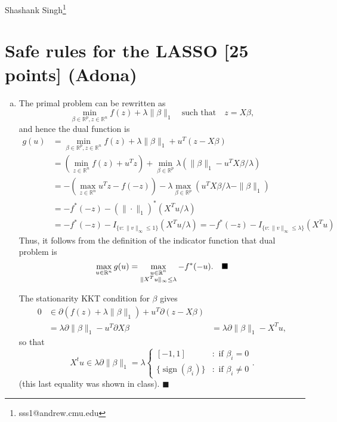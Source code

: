 \documentclass[12pt]{article}
\newcommand{\R}{\mathbb{R}}
\renewcommand{\qed}{\quad \ensuremath{\blacksquare}}
\newcommand{\sgn}{{\operatorname{sign}}}
\begin{document}
Shashank Singh\footnote{sss1@andrew.cmu.edu}
\setcounter{section}{1}
\section{Safe rules for the LASSO [25 points] (Adona)}
\begin{enumerate}[(a)]
\item The primal problem can be rewritten as
\[\min_{\beta \in \R^p, z \in \R^n} f(z) + \lambda\|\beta\|_1
    \quad \mbox{such that} \quad z = X\beta,
\]
and hence the dual function is
\begin{align*}
g(u)
 &  = \min_{\beta \in \R^p, z \in \R^n} f(z) + \lambda\|\beta\|_1
        + u^T(z - X\beta)   \\
 &  = \left( \min_{z \in \R^n} f(z) + u^Tz \right)
    + \min_{\beta \in \R^p} \lambda ( \|\beta\|_1 - u^TX\beta/\lambda)  \\
 &  = -\left( \max_{z \in \R^n} u^Tz - f(-z) \right)
    - \lambda \max_{\beta \in \R^p} (u^TX\beta/\lambda - \|\beta\|_1)   \\
 &  = -f^*(-z) - \left( \|\cdot\|_1 \right)^* (X^Tu/\lambda)            \\
 &  = -f^*(-z) - I_{\{v : \|v\|_\infty \leq 1\}}(X^Tu/\lambda)
    = -f^*(-z) - I_{\{v : \|v\|_\infty \leq \lambda\}}(X^Tu)
\end{align*}
Thus, it follows from the definition of the indicator function that dual
problem is
\[\max_{u \in \R^n} g(u)
    = \max_{
        \begin{subarray}{c}
            u \in \R^n\\
            \|X^Tu\|_\infty \leq \lambda
        \end{subarray}} -f^*(-u). \qed
\]

The stationarity KKT condition for $\beta$ gives
\begin{align*}
0
 &  \in \partial (f(z) + \lambda\|\beta\|_1) + u^T \partial (z - X\beta)    \\
 &  = \lambda \partial \|\beta\|_1 - u^T \partial X\beta
 &  = \lambda \partial \|\beta\|_1 - X^Tu,
\end{align*}
so that
\[X^tu \in \lambda \partial \|\beta\|_1
    = \lambda \left\{
        \begin{array}{ll}
            [-1,1]              & : \mbox{ if } \beta_i = 0      \\
            \{\sgn(\beta_i)\}   & : \mbox{ if } \beta_i \neq 0
        \end{array}
    \right..
\]
(this last equality was shown in class). \qed


\end{enumerate}
\end{document}
